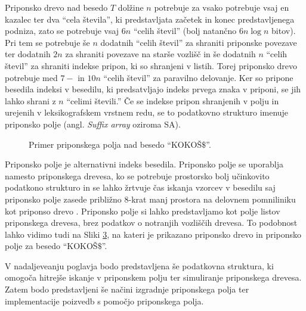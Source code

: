 Priponsko drevo nad besedo $T$ dolžine $n$ potrebuje za vsako potrebuje vsaj en kazalec ter dva \enquote{cela števila}, ki predstavljata začetek in konec predstavljenega podniza, zato se potrebuje vsaj $6n$ \enquote{celih števil} (bolj natančno $6n\log{n}$ bitov). Pri tem se potrebuje še $n$ dodatnih \enquote{celih števil} za shraniti priponske povezave ter dodatnih $2n$ za shraniti povezave na starše vozlišč in še dodatnih $n$ \enquote{celih števil} za shraniti indekse pripon, ki so shranjeni v listih. Torej priponsko drevo potrebuje med $7-$  in $10n$ \enquote{celih števil} za paravilno delovanje. Ker so pripone besedila indeksi v besedilu, ki predsatvljajo indeks prvega znaka v priponi, se jih lahko shrani z $n$ \enquote{celimi števili.} Če se indekse pripon shranjenih v polju in urejenih v leksikografskem vrstnem redu, se to podatkovno strukturo imenuje priponsko polje (angl. \textit{Suffix array} oziroma SA).

\begin{figure}[htb]
    \begin{subfigure}[t]{\linewidth}
        
        
        \centering
        \subcaption*{}
        \label{fig:aSADrevo}
    \end{subfigure}
    \begin{subfigure}[t]{1\linewidth}        
        
        \centering
        \subcaption*{}
        \label{fig:aSAPolje}
    \end{subfigure}
    \caption{Primer priponskega polja nad besedo \enquote{KOKOŠ$\$$}.} 
    \label{fig:SuffuxArray}
\end{figure}

Priponsko polje je alternativni indeks besedila. Priponsko polje se uporablja namesto priponskega drevesa, ko se potrebuje prostorsko bolj učinkovito podatkono strukturo in se lahko žrtvuje čas iskanja vzorcev v besedilu saj priponsko polje zasede približno 8-krat manj prostora na delovnem pomniliniku kot priponso drevo \cite{Manber1990}. Priponsko polje si lahko predstavljamo kot polje listov priponskega drevesa, brez podatkov o notranjih vozliščih drevesa. To podobnost lahko vidimo tudi na Sliki \ref{fig:SuffuxArray}, na kateri je prikazano priponsko drevo in priponsko polje za besedo \enquote{KOKOŠ$\$$}.

V nadaljeveanju poglavja bodo predstavljena še podatkovna struktura, ki omogoča hitrejše iskanje v priponskem polju ter simuliranje priponskega drevesa. Zatem bodo predstavljeni še načini izgradnje priponskega polja ter implementacije poizvedb s pomočjo priponskega polja.

